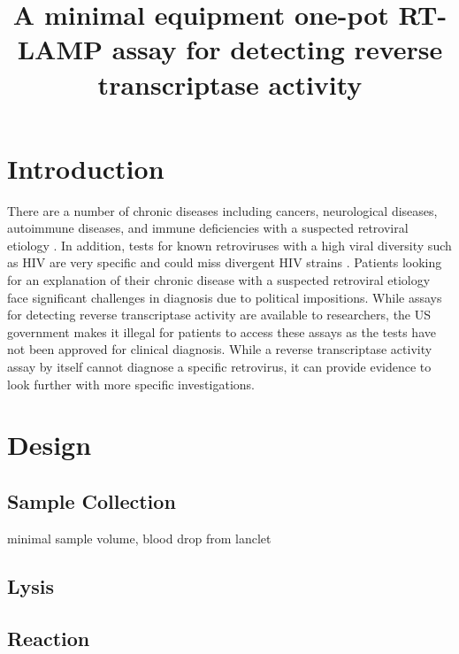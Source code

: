 \documentclass{article}
\title{A minimal equipment one-pot RT-LAMP assay for detecting reverse transcriptase activity}
\begin{document}
\maketitle
\newpage

\section{Introduction}

There are a number of chronic diseases including cancers, neurological diseases, autoimmune diseases, and immune deficiencies with a suspected retroviral etiology \cite{voisset2008human}. In addition, tests for known retroviruses with a high viral diversity such as HIV are very specific and could miss divergent HIV strains \cite{bartolo2012hiv}\cite{luft2011hiv}. Patients looking for an explanation of their chronic disease with a suspected retroviral etiology face significant challenges in diagnosis due to political impositions. While assays for detecting reverse transcriptase activity are available to researchers, the US government makes it illegal for patients to access these assays as the tests have not been approved for clinical diagnosis. While a reverse transcriptase activity assay by itself cannot diagnose a specific retrovirus, it can provide evidence to look further with more specific investigations.



\section{Design}



\subsection{Sample Collection}

minimal sample volume, blood drop from lanclet 

\subsection{Lysis}

\cite{malmsten2005reverse}

\cite{karamohamed1998bioluminometric}

\cite{curtis2008rapid}

\subsection{Reaction}





\end{document}
